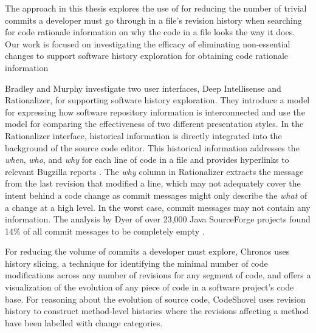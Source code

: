 The approach in this thesis explores the use of  for  reducing 
the number of trivial commits a developer must go through in a file's revision history when searching 
for code rationale information on why the code in a file looks the way it does.
Our work is focused on investigating the efficacy of eliminating non-essential changes
to support software history exploration for obtaining code rationale information

Bradley and Murphy \cite{bradley_supporting_2011} investigate two user interfaces, Deep Intellisense and Rationalizer, 
for supporting software history exploration.
They introduce a model for expressing how software repository information is interconnected 
and use the model for comparing the effectiveness of two different presentation styles.
In the Rationalizer interface, historical information is directly integrated into the background of the source code editor.
This historical information addresses the \emph{when}, \emph{who}, and \emph{why} for each line of code in a file 
and provides hyperlinks to relevant Bugzilla reports \cite{bradley_supporting_2011}.
The \emph{why} column in Rationalizer extracts the message from the last revision that modified a line, 
which may not adequately cover the intent behind a code change as commit messages 
might only describe the \emph{what} of a change at a high level.
In the worst case, commit messages may not contain any information.
The analysis by Dyer \etal of over 23,000 Java SourceForge projects found 14\% of all 
commit messages to be completely empty \cite{dyer_boa_2013}.

For reducing the volume of commits a developer must explore, Chronos \cite{servant_history_2012} uses history slicing, 
a technique for identifying the minimal number of code modifications across any number of revisions for any segment of code, 
and offers a visualization of the evolution of any piece of code in a software project's code base.
For reasoning about the evolution of source code, CodeShovel \cite{grund_codeshovel_2021} 
uses revision history to construct method-level histories where the revisions affecting a 
method have been labelled with change categories.

